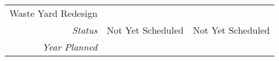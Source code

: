 \begin{tabularx}{\textwidth}{r|X|X|}
\multicolumn{1}{|V{.2\columnwidth}|}{\cellcolor{ccorangelight}Waste Yard Redesign}          &                                                                  &                                                                  \\
    \multicolumn{1}{|r|}{\cellcolor{ccorangelight}\textit{Status}}                & Not Yet Scheduled                                                         & Not Yet Scheduled                                                         \\
    \multicolumn{1}{|r|}{\cellcolor{ccorangelight}\textit{Year Planned}}                  &                                                      &                                                      \\ \hline
\end{tabularx}